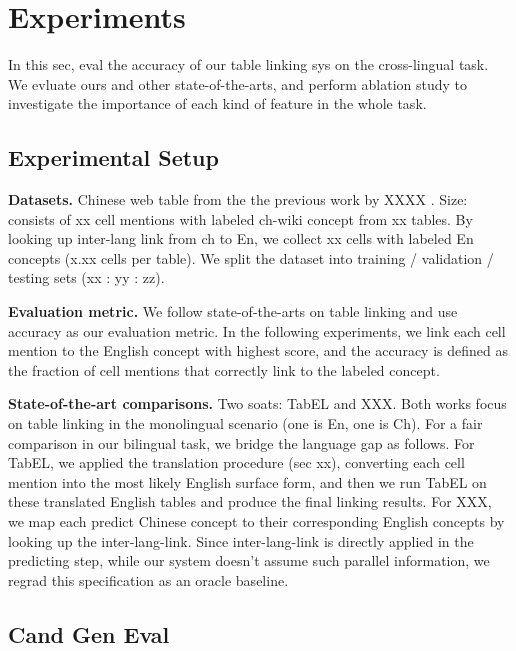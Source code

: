 \section{Experiments}
\label{sec:eval}



In this sec, eval the accuracy of our table linking sys on the cross-lingual task.
We evluate ours and other state-of-the-arts, and perform ablation study to investigate
the importance of each kind of feature in the whole task.

\subsection{Experimental Setup}

\textbf{Datasets.} 
Chinese web table from the the previous work by XXXX \shortcite{}.
Size: consists of xx cell mentions with labeled ch-wiki concept from xx tables.
By looking up inter-lang link from ch to En, we collect xx cells with labeled En concepts
(x.xx cells per table).
We split the dataset into training / validation / testing sets (xx : yy : zz).

\noindent
\textbf{Evaluation metric.}
We follow state-of-the-arts on table linking and use accuracy as our evaluation metric.
In the following experiments, we link each cell mention to the English concept with highest score, and the accuracy is defined as the fraction of cell mentions that correctly link to the labeled concept.

\noindent
\textbf{State-of-the-art comparisons.}
Two soats: TabEL and XXX.
Both works focus on table linking in the monolingual scenario (one is En, one is Ch).
For a fair comparison in our bilingual task, we bridge the language gap as follows.
For TabEL, we applied the translation procedure (sec xx), converting each cell mention into
the most likely English surface form, and then we run TabEL on these translated English
tables and produce the final linking results.
For XXX, we map each predict Chinese concept to their corresponding English concepts by looking up the inter-lang-link.
Since inter-lang-link is directly applied in the predicting step, 
while our system doesn't assume such parallel information,
we regrad this specification as an oracle baseline.






\subsection{Cand Gen Eval}
\label{sec:cand-gen-eval}

